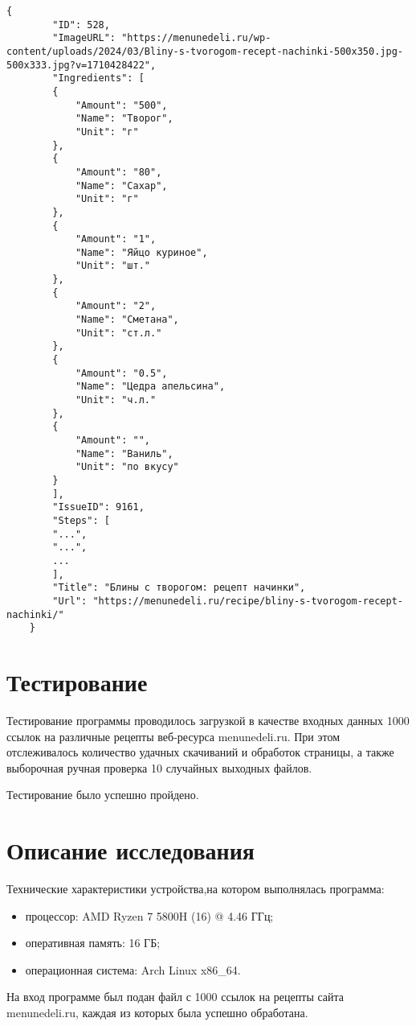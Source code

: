 \begin{lstlisting}[label=after,caption={json рецепта после обработки}]
	{
		"ID": 528,
		"ImageURL": "https://menunedeli.ru/wp-content/uploads/2024/03/Bliny-s-tvorogom-recept-nachinki-500х350.jpg-500x333.jpg?v=1710428422",
		"Ingredients": [
		{
			"Amount": "500",
			"Name": "Творог",
			"Unit": "г"
		},
		{
			"Amount": "80",
			"Name": "Сахар",
			"Unit": "г"
		},
		{
			"Amount": "1",
			"Name": "Яйцо куриное",
			"Unit": "шт."
		},
		{
			"Amount": "2",
			"Name": "Сметана",
			"Unit": "ст.л."
		},
		{
			"Amount": "0.5",
			"Name": "Цедра апельсина",
			"Unit": "ч.л."
		},
		{
			"Amount": "",
			"Name": "Ваниль",
			"Unit": "по вкусу"
		}
		],
		"IssueID": 9161,
		"Steps": [
		"...",
		"...",
		...
		],
		"Title": "Блины с творогом: рецепт начинки",
		"Url": "https://menunedeli.ru/recipe/bliny-s-tvorogom-recept-nachinki/"
	}
\end{lstlisting}
\vspace{20mm}
{\let\clearpage\relax \chapter{Тестирование}}

Тестирование программы проводилось загрузкой в качестве входных данных 1000 ссылок на различные рецепты веб-ресурса menunedeli.ru. При этом отслеживалось количество удачных скачиваний и обработок страницы, а также выборочная ручная проверка 10 случайных выходных файлов. 

Тестирование было успешно пройдено.

\vspace{20mm}
{\let\clearpage\relax \chapter{Описание исследования}}

Технические характеристики устройства,на котором выполнялась программа:

\begin{itemize}
	\item процессор: AMD Ryzen 7 5800H (16) @ 4.46 ГГц;
	\item оперативная память: 16 ГБ;
	\item операционная система: Arch Linux x86\_64.
\end{itemize}

На вход программе был подан файл с 1000 ссылок на рецепты сайта menunedeli.ru, каждая из которых была успешно обработана.

